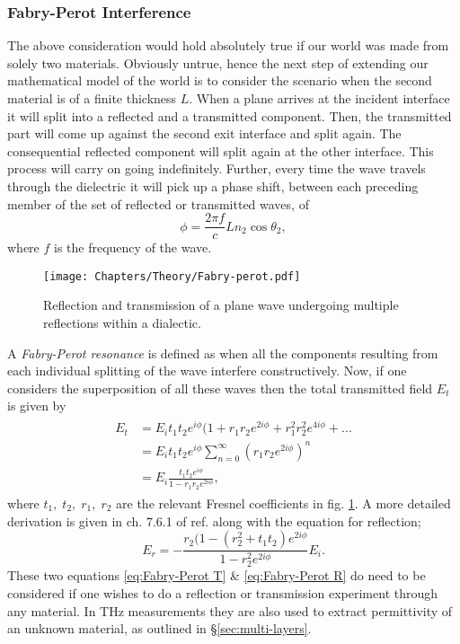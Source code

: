 \subsubsection{Fabry-Perot Interference}\label{sec:Fabry_Perot}
The above consideration would hold absolutely true if our world was made from solely two materials. Obviously untrue, hence the next step of extending our mathematical model of the world is to consider the scenario when the second material is of a finite thickness $L$. When a plane arrives at the incident interface it will split into a reflected and a transmitted component. Then, the transmitted part will come up against the second exit interface and split again. The consequential reflected component will split again at the other interface. This process will carry on going indefinitely. Further, every time the wave travels through the dielectric it will pick up a phase shift, between each preceding member of the set of reflected or transmitted waves, of
\begin{equation}
\phi=\frac{2 \pi f}{c}L n_{2}\cos \theta_2,
\label{eq:phase}
\end{equation}
where $f$ is the frequency of the wave. 
\begin{figure}[h]\centering
\texttt{[image: Chapters/Theory/Fabry-perot.pdf]}
\caption{Reflection and transmission of a plane wave undergoing multiple reflections within a dialectic.}
\label{fig:Fabry-perot}
\end{figure}
A \textit{Fabry-Perot resonance} is defined as when all the components resulting from each individual splitting of the wave interfere constructively. Now, if one considers the superposition of all these waves then the total transmitted field $E_t$ is given by
\begin{equation}
\begin{split}
\begin{split}
E_t&=E_i t_1 t_2e^{i\phi}(1+r_1 r_2 e^{2i\phi}+ r_1^2 r_2^2 e^{4i\phi}+...
\\ &=E_i t_1 t_2 e^{i\phi}\sum_{n=0}^{\infty}(r_1 r_2 e^{2i\phi})^{n}
\\ &=E_i \frac{ t_1 t_2e^{i\phi}}{1 - r_1 r_2 e^{2i\phi}},
\label{eq:Fabry-Perot T}
\end{split}
\end{split}
\end{equation}
where $t_1,\; t_2,\; r_1,\; r_2$ are the relevant Fresnel coefficients in fig. \ref{fig:Fabry-perot}. A more detailed derivation is given in ch. 7.6.1 of ref. \cite{Wolf.Optics} along with the equation for reflection;
\begin{equation}
E_r=-\frac{r_2(1-(r_2^2+t_1 t_2)e^{2i\phi}}{1-r_2^2 e^{2i\phi}}E_i.
\label{eq:Fabry-Perot R}
\end{equation}
These two equations \eqref{eq:Fabry-Perot T} \& \eqref{eq:Fabry-Perot R} do need to be considered if one wishes to do a reflection or transmission experiment through any material. In THz measurements they are also used to extract permittivity of an unknown material, as outlined in \S\ref{sec:multi-layers}.






